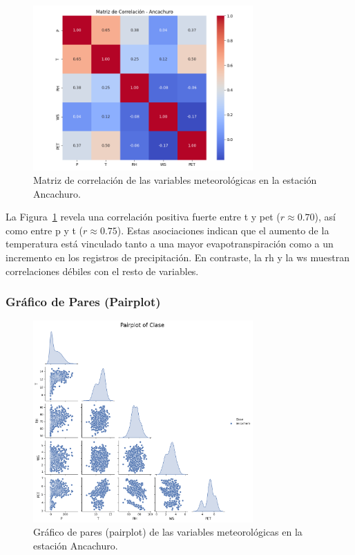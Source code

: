 \begin{figure}[htbp]
\centering
\includegraphics[width=0.75\textwidth]{resultados/por_estacion_meteorologica/Ancachuro/matriz_correlacion.png}
\caption{Matriz de correlación de las variables meteorológicas en la estación Ancachuro.}
\label{fig:ancachuro_corr}
\end{figure}

La Figura~\ref{fig:ancachuro_corr} revela una correlación positiva fuerte entre \gls{t} y \gls{pet} ($r \approx 0.70$), así como entre \gls{p} y \gls{t} ($r \approx 0.75$). Estas asociaciones indican que el aumento de la temperatura está vinculado tanto a una mayor evapotranspiración como a un incremento en los registros de precipitación. En contraste, la \gls{rh} y la \gls{ws} muestran correlaciones débiles con el resto de variables.

\subsubsection*{Gráfico de Pares (Pairplot)}

\begin{figure}[htbp]
\centering
\includegraphics[width=0.75\textwidth]{resultados/por_estacion_meteorologica/Ancachuro/pairplot.png}
\caption{Gráfico de pares (pairplot) de las variables meteorológicas en la estación Ancachuro.}
\label{fig:ancachuro_pairplot}
\end{figure}

